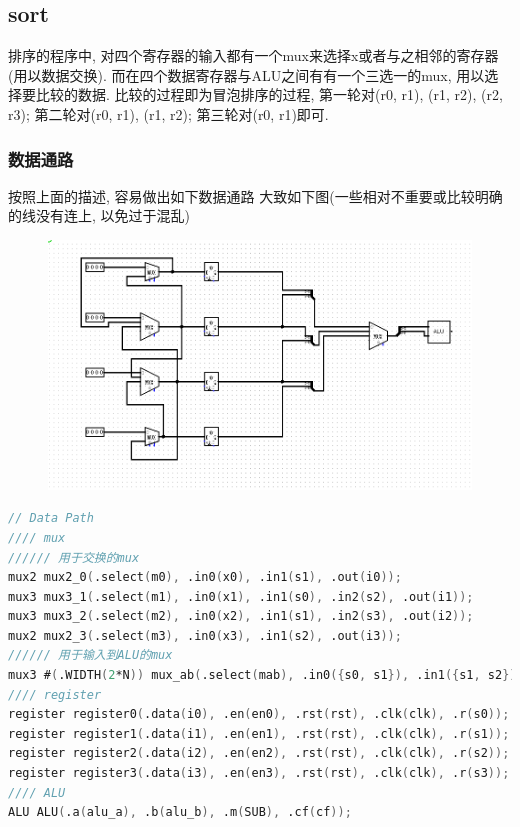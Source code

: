 \documentclass[UTF8]{article}
\begin{document}
\subsection{sort}
排序的程序中, 对四个寄存器的输入都有一个mux来选择x或者与之相邻的寄存器(用以数据交换). 而在四个数据寄存器与ALU之间有有一个三选一的mux, 用以选择要比较的数据.
比较的过程即为冒泡排序的过程, 第一轮对(r0, r1), (r1, r2), (r2, r3); 第二轮对(r0, r1), (r1, r2); 第三轮对(r0, r1)即可.
\subsubsection{数据通路}
按照上面的描述, 容易做出如下数据通路
大致如下图(一些相对不重要或比较明确的线没有连上, 以免过于混乱)
\begin{figure}[H]
	\centering
	\includegraphics[scale=0.5]{circuit.png}
\end{figure}\par
\begin{lstlisting}[language=verilog]
// Data Path
//// mux
////// 用于交换的mux
mux2 mux2_0(.select(m0), .in0(x0), .in1(s1), .out(i0));
mux3 mux3_1(.select(m1), .in0(x1), .in1(s0), .in2(s2), .out(i1));
mux3 mux3_2(.select(m2), .in0(x2), .in1(s1), .in2(s3), .out(i2));
mux2 mux2_3(.select(m3), .in0(x3), .in1(s2), .out(i3));
////// 用于输入到ALU的mux
mux3 #(.WIDTH(2*N)) mux_ab(.select(mab), .in0({s0, s1}), .in1({s1, s2}), .in2({s2, s3}), .out({alu_a, alu_b}));
//// register
register register0(.data(i0), .en(en0), .rst(rst), .clk(clk), .r(s0));
register register1(.data(i1), .en(en1), .rst(rst), .clk(clk), .r(s1));
register register2(.data(i2), .en(en2), .rst(rst), .clk(clk), .r(s2));
register register3(.data(i3), .en(en3), .rst(rst), .clk(clk), .r(s3));
//// ALU
ALU ALU(.a(alu_a), .b(alu_b), .m(SUB), .cf(cf));
\end{lstlisting}
\end{document}
